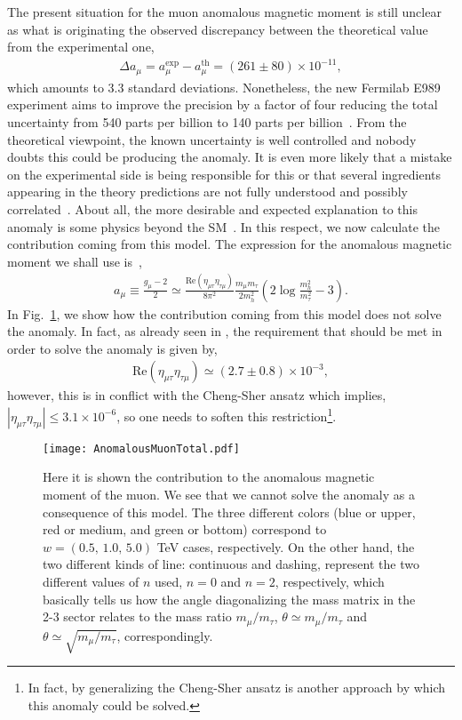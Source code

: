 \documentclass[aps,prd,groupaddress,floatfix,tighten,nofootinbib,showpacs,
amsfonts,superscriptaddress]{revtex4}
\begin{document}
{The present situation for the muon anomalous magnetic moment is still unclear as what is originating the observed discrepancy between the theoretical value from the experimental one,
\begin{eqnarray}
	\Delta a_\mu = a_\mu^{\text{exp}} - a_\mu^{\text{th}} = (261 \pm 80) \times 10^{-11},
\end{eqnarray}
which amounts to 3.3 standard deviations.  Nonetheless, the new Fermilab E989 experiment aims to improve the precision by a factor of four reducing the total uncertainty from 540 parts per billion to 140 parts per billion~\cite{Chapelain:2017syu}. From the theoretical viewpoint, the known uncertainty is well controlled and nobody doubts this could be producing the anomaly. It is even more likely that a mistake on the experimental side is being responsible for this or that several ingredients appearing in the theory predictions are not fully understood and possibly correlated~\cite{Melnikov:2016wdt, Melnikov:2006sr,Melnikov:2001uw}. About all, the more desirable and expected explanation to this anomaly is some physics beyond the SM~\cite{Czarnecki:2001pv}. In this respect, we now calculate the contribution coming from this model.
The expression for the anomalous magnetic moment we shall use is~\cite{Harnik:2012pb},
\begin{eqnarray}
     a_\mu \equiv \frac{g_\mu -2 }{2} \simeq \frac{\text{Re}(\eta_{\mu \tau} \eta_{\tau \mu}) }{8\pi^2} 
	\frac{m_\mu m_\tau}{2m_h^2} \left( 2 \log \frac{m_h^2}{m_\tau^2} - 3 \right).
\end{eqnarray} 
{In Fig.~\ref{muonAnomaly}, we show how the contribution coming from this model does not solve the anomaly. In fact, as already seen in \cite{Harnik:2012pb},  the requirement that should be met in order to solve the anomaly is given by,
\begin{eqnarray}
	{\text{Re}}(\eta_{\mu \tau} \eta_{\tau \mu}) \simeq (2.7 \pm 0.8) \times 10^{-3},
\end{eqnarray}
however, this is in conflict with the Cheng-Sher ansatz which implies, $| \eta_{\mu \tau} \eta_{\tau \mu} | \leq3.1 \times 10^{-6}$, so one needs to soften this restriction\footnote{In fact, by generalizing the Cheng-Sher ansatz is another approach by which this anomaly could be solved.}. }
%
\begin{figure}[H]
\centering
\texttt{[image: AnomalousMuonTotal.pdf]}
\caption{Here it is shown the contribution to the anomalous magnetic moment of the muon. We see that we cannot solve the anomaly as a consequence of this model. 
The three different colors (blue or upper, red or medium, and green or bottom) correspond to $w = (0.5,\, 1.0, \, 5.0)$ TeV cases, respectively. On the other hand, the two different kinds of line: continuous and dashing, represent the two different values of $n$ used, $n=0$ and $n=2$, respectively, which basically tells us how the angle diagonalizing the mass matrix in the 2-3 sector relates to the mass ratio $m_\mu / m_\tau$, $\theta \simeq m_\mu / m_\tau$ and $\theta \simeq \sqrt{m_\mu / m_\tau}$, correspondingly.} 
\label{muonAnomaly}
\end{figure}

}
\end{document}
